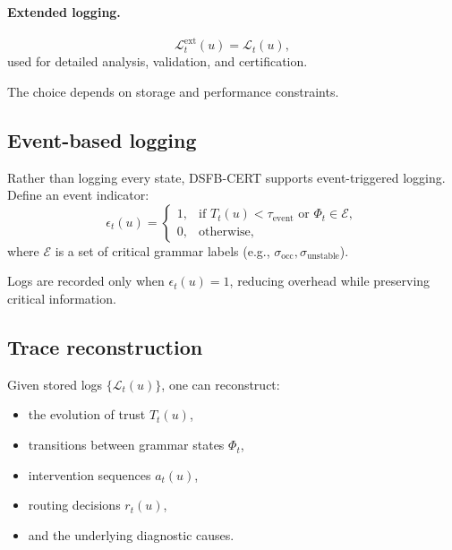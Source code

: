 \documentclass[11pt]{article}
\theoremstyle{definition}
\theoremstyle{plain}
\begin{document}
\paragraph{Extended logging.}
\begin{equation}
\mathcal{L}^{\mathrm{ext}}_t(u)=\mathcal{L}_t(u),
\end{equation}
used for detailed analysis, validation, and certification.

The choice depends on storage and performance constraints.


\subsection{Event-based logging}

Rather than logging every state, DSFB-CERT supports event-triggered logging. Define an event indicator:
\begin{equation}
\epsilon_t(u)=
\begin{cases}
1, & \text{if } T_t(u)<\tau_{\mathrm{event}} \text{ or } \Phi_t\in\mathcal{E},\\
0, & \text{otherwise},
\end{cases}
\end{equation}
where $\mathcal{E}$ is a set of critical grammar labels (e.g., $\sigma_{\mathrm{occ}},\sigma_{\mathrm{unstable}}$).

Logs are recorded only when $\epsilon_t(u)=1$, reducing overhead while preserving critical information.


\subsection{Trace reconstruction}

Given stored logs $\{\mathcal{L}_t(u)\}$, one can reconstruct:
\begin{itemize}[leftmargin=1.5em]
    \item the evolution of trust $T_t(u)$,
    \item transitions between grammar states $\Phi_t$,
    \item intervention sequences $a_t(u)$,
    \item routing decisions $r_t(u)$,
    \item and the underlying diagnostic causes.
\end{itemize}
\end{document}
